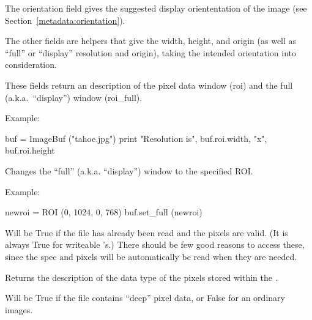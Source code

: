 The {\cf orientation} field gives the suggested display oriententation of
the image (see Section~\ref{metadata:orientation}).

The other fields are helpers that give the width, height, and origin
(as well as ``full'' or ``display'' resolution and origin), taking the
intended orientation into consideration.
\apiend

These fields return an \ROI description of the pixel data window
({\cf roi}) and the full (a.k.a.\ ``display'') window ({\cf roi_full}).

\noindent Example:
\begin{code}
    buf = ImageBuf ("tahoe.jpg")
    print "Resolution is", buf.roi.width, "x", buf.roi.height
\end{code}
\apiend

Changes the ``full'' (a.k.a. ``display'') window to the specified ROI.

\noindent Example:
\begin{code}
    newroi = ROI (0, 1024, 0, 768)
    buf.set_full (newroi)
\end{code}
\apiend

Will be {\cf True} if the file has already been read and the pixels are
valid. (It is always {\cf True} for writeable \ImageBuf's.)
There should be few good reasons to access these, since the spec and pixels
will be automatically be read when they are needed. 
\apiend

Returns the description of the data type of the pixels stored within the
\ImageBuf.
\apiend

Will be {\cf True} if the file contains ``deep'' pixel data, or {\cf False}
for an ordinary images.
\apiend


